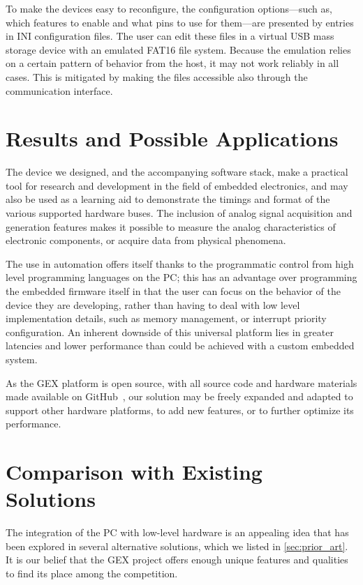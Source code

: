 To make the devices easy to reconfigure, the configuration options---such as, which features to enable and what pins to use for them---are presented by entries in INI configuration files. The user can edit these files in a virtual \gls{USB} mass storage device with an emulated FAT16 file system. Because the emulation relies on a certain pattern of behavior from the host, it may not work reliably in all cases. This is mitigated by making the files accessible also through the communication interface.

\section{Results and Possible Applications}

The device we designed, and the accompanying software stack, make a practical tool for research and development in the field of embedded electronics, and may also be used as a learning aid to demonstrate the timings and format of the various supported hardware buses. The inclusion of analog signal acquisition and generation features makes it possible to measure the analog characteristics of electronic components, or acquire data from physical phenomena. 

The use in automation offers itself thanks to the programmatic control from high level programming languages on the \gls{PC}; this has an advantage over programming the embedded firmware itself in that the user can focus on the behavior of the device they are developing, rather than having to deal with low level implementation details, such as memory management, or interrupt priority configuration. An inherent downside of this universal platform lies in greater latencies and lower performance than could be achieved with a custom embedded system.

As the GEX platform is open source, with all source code and hardware materials made available on GitHub~\cite{gex-gh}, our solution may be freely expanded and adapted to support other hardware platforms, to add new features, or to further optimize its performance.

\section{Comparison with Existing Solutions}

The integration of the \gls{PC} with low-level hardware is an appealing idea that has been explored in several alternative solutions, which we listed in \cref{sec:prior_art}. It is our belief that the GEX project offers enough unique features and qualities to find its place among the competition.

